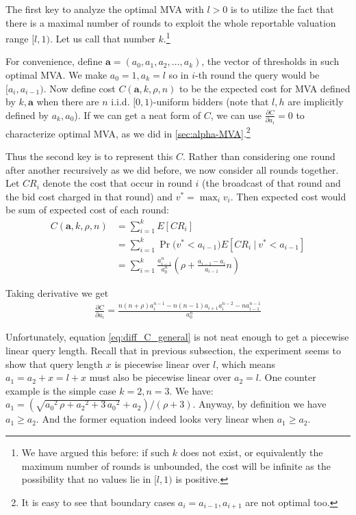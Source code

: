 The first key to analyze the optimal MVA with $l > 0$ is to utilize
the fact that there is a maximal number of rounds to exploit the whole
reportable valuation range $[l, 1)$. Let us call that
number $k$.\footnote{We have argued this before: if such $k$ does not exist, or equivalently
the maximum number of rounds is unbounded, the cost will be infinite as the possibility that no
values lie in $[l, 1)$ is positive.}

For convenience, define $\boldsymbol a = (a_0, a_1, a_2, \ldots, a_k)$, the vector of
thresholds in such optimal MVA. We make $a_0 = 1, a_k = l$ so in $i$-th
round the query would be $[a_i, a_{i-1})$. Now define cost $C(\boldsymbol a, k, \rho,
n)$ to be the expected cost for MVA defined by $k, \boldsymbol a$ when there are $n$
i.i.d.  $[0, 1)$-uniform bidders (note that $l, h$ are implicitly defined by
$a_k, a_0$). If we can get a neat form of $C$, we can use $\frac{\partial
C}{\partial a_i} = 0 $ to characterize optimal MVA, as we did in 
\ref{sec:alpha-MVA}.\footnote{It is easy to see that boundary cases $a_i = a_{i-1},
a_{i+1}$ are not optimal too.}

Thus the second key is to represent this $C$. Rather than
considering one round after another recursively as we did before, we now consider all
rounds together. Let $CR_i$ denote the cost that occur in round $i$ (the broadcast
of that round and the bid cost charged in that round) and $v^* = \max_i v_i$. Then expected cost
would be sum of expected cost of each round:
\begin{align}
C(\boldsymbol a, k, \rho, n) &= \sum_{i=1}^k E[ CR_i ] \nonumber \\
  &= \sum_{i=1}^{k} \Pr\big( v^* < a_{i-1} \big) E[CR_i ~|~ v^* < a_{i-1}] \nonumber \\
  &= \sum_{i=1}^{k} \frac{a_{i-1}^n}{a_0^n} \left( \rho + \frac{a_{i-1}-a_{i}}{a_{i-1}} n \right)
  \label{eq:C_general_simplified}
\end{align}

Taking derivative we get
\begin{align}
 \frac{\partial C}{\partial a_i} = \frac{
	n(n+\rho)a_i^{n-1}-n(n-1)a_{i+1}a_i^{n-2}-n a_{i-1}^{n-1} }{a_0^n}
	\label{eq:diff_C_general}
\end{align}

Unfortunately, equation
\ref{eq:diff_C_general} is not neat enough to get a piecewise linear query length.
Recall that in previous subsection, the experiment seems to show that query length $x$ is
piecewise linear over $l$, which means $a_1 = a_2+x = l+x$ must also be
piecewise linear over $a_2 = l$.  One counter example is the simple case $k =
2, n = 3$. We have: $a_1 =
(\sqrt{{a_0}^{2}\,\rho+{a_2}^{2}+3\,{a_0}^{2}}+a_2)/(\rho+3)$.  Anyway, by
definition we have $a_1 \geq a_2$. And the former equation indeed looks very
linear when $a_1 \geq a_2$.


